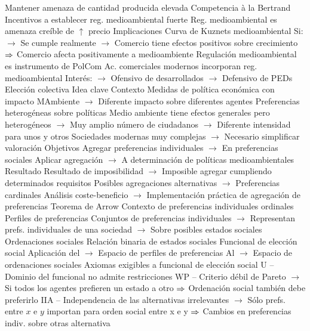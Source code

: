 \documentclass{nuevotema}
\begin{document}
\begin{esquemal}
				\4[] Mantener amenaza de cantidad producida elevada
				\4 Competencia à la Bertrand
				\4[] Incentivos a establecer reg. medioambiental fuerte
				\4[] Reg. medioambiental es amenaza creíble de $\uparrow$ precio
			\3 Implicaciones
				\4 Curva de Kuznets medioambiental
				\4[] Si:
				\4[] $\to$ Se cumple realmente
				\4[] $\to$ Comercio tiene efectos positivos sobre crecimiento
				\4[] $\Rightarrow$ Comercio afecta positivamente a medioambiente
				\4 Regulación medioambiental es instrumento de PolCom
				\4 Ac. comerciales modernos incorporan reg. medioambiental
				\4[] Interés:
				\4[] $\to$ Ofensivo de desarrollados
				\4[] $\to$ Defensivo de PEDs
		\2 Elección colectiva
			\3 Idea clave
				\4 Contexto
				\4[] Medidas de política económica con impacto MAmbiente
				\4[] $\to$ Diferente impacto sobre diferentes agentes
				\4[] Preferencias heterogéneas sobre políticas
				\4[] Medio ambiente tiene efectos generales pero heterogéneos
				\4[] $\to$ Muy amplio número de ciudadanos
				\4[] $\to$ Diferente intensidad para unos y otros
				\4[] Sociedades modernas muy complejas
				\4[] $\to$ Necesario simplificar valoración
				\4 Objetivos
				\4[] Agregar preferencias individuales
				\4[] $\to$ En preferencias sociales
				\4[] Aplicar agregación
				\4[] $\to$ A determinación de políticas medioambientales
				\4 Resultado
				\4[] Resultado de imposibilidad
				\4[] $\to$ Imposible agregar cumpliendo determinados requisitos
				\4[] Posibles agregaciones alternativas
				\4[] $\to$ Preferencias cardinales
				\4[] Análisis coste-beneficio
				\4[] $\to$ Implementación práctica de agregación de preferencias
			\3 Teorema de Arrow
				\4 Contexto de preferencias individuales ordinales
				\4 Perfiles de preferencias
				\4[] Conjuntos de preferencias individuales
				\4[] $\to$ Representan prefs. individuales de una sociedad
				\4[] $\to$ Sobre posibles estados sociales
				\4 Ordenaciones sociales
				\4[] Relación binaria de estados sociales
				\4 Funcional de elección social
				\4[] Aplicación del
				\4[] $\to$ Espacio de perfiles de preferencias
				\4[] Al
				\4[] $\to$ Espacio de ordenaciones sociales
				\4 Axiomas exigibles a funcional de elección social
				\4[] U -- Dominio del funcional no admite restricciones
				\4[] WP -- Criterio débil de Pareto
				\4[] $\to$ Si todos los agentes prefieren un estado a otro
				\4[] $\Rightarrow$ Ordenación social también debe preferirlo
				\4[] IIA -- Independencia de las alternativas irrelevantes
				\4[] $\to$ Sólo prefs. entre $x$ e $y$ importan para orden social entre x e y
				\4[] $\Rightarrow$ Cambios en preferencias indiv. sobre otras alternativa

\end{esquemal}
\end{document}
